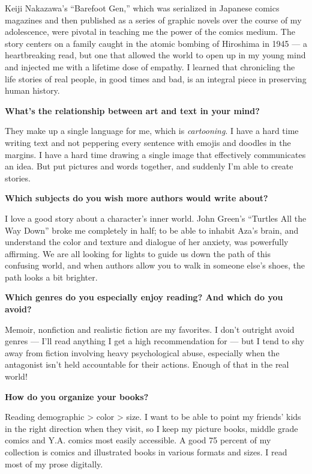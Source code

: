 Keiji Nakazawa's ``Barefoot Gen,'' which was serialized in Japanese
comics magazines and then published as a series of graphic novels over
the course of my adolescence, were pivotal in teaching me the power of
the comics medium. The story centers on a family caught in the atomic
bombing of Hiroshima in 1945 --- a heartbreaking read, but one that
allowed the world to open up in my young mind and injected me with a
lifetime dose of empathy. I learned that chronicling the life stories of
real people, in good times and bad, is an integral piece in preserving
human history.

\textbf{What's the relationship between art and text in your mind?}

They make up a single language for me, which is \emph{cartooning}. I
have a hard time writing text and not peppering every sentence with
emojis and doodles in the margins. I have a hard time drawing a single
image that effectively communicates an idea. But put pictures and words
together, and suddenly I'm able to create stories.

\textbf{Which subjects do you wish more authors would write about?}

I love a good story about a character's inner world. John Green's
``Turtles All the Way Down'' broke me completely in half; to be able to
inhabit Aza's brain, and understand the color and texture and dialogue
of her anxiety, was powerfully affirming. We are all looking for lights
to guide us down the path of this confusing world, and when authors
allow you to walk in someone else's shoes, the path looks a bit
brighter.

\textbf{Which genres do you especially enjoy reading? And which do you
avoid?}

Memoir, nonfiction and realistic fiction are my favorites. I don't
outright avoid genres --- I'll read anything I get a high recommendation
for --- but I tend to shy away from fiction involving heavy
psychological abuse, especially when the antagonist isn't held
accountable for their actions. Enough of that in the real world!

\textbf{How do you organize your books?}

Reading demographic \textgreater{} color \textgreater{} size. I want to
be able to point my friends' kids in the right direction when they
visit, so I keep my picture books, middle grade comics and Y.A. comics
most easily accessible. A good 75 percent of my collection is comics and
illustrated books in various formats and sizes. I read most of my prose
digitally.

